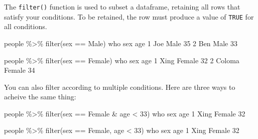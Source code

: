 \documentclass[
]{book}
\newenvironment{Shaded}{\begin{snugshade}}{\end{snugshade}}
\newcommand{\DecValTok}[1]{\textcolor[rgb]{0.00,0.00,0.81}{#1}}
\newcommand{\FunctionTok}[1]{\textcolor[rgb]{0.00,0.00,0.00}{#1}}
\newcommand{\NormalTok}[1]{#1}
\newcommand{\SpecialCharTok}[1]{\textcolor[rgb]{0.00,0.00,0.00}{#1}}
\newcommand{\StringTok}[1]{\textcolor[rgb]{0.31,0.60,0.02}{#1}}
\begin{document}
The \texttt{filter()} function is used to subset a dataframe, retaining all rows that satisfy your conditions. To be retained, the row must produce a value of \texttt{TRUE} for all conditions.

\begin{Shaded}
\begin{Highlighting}[]
\NormalTok{people }\SpecialCharTok{\%\textgreater{}\%} \FunctionTok{filter}\NormalTok{(sex }\SpecialCharTok{==} \StringTok{\textquotesingle{}Male\textquotesingle{}}\NormalTok{)}
\NormalTok{  who  sex age}
\DecValTok{1}\NormalTok{ Joe Male  }\DecValTok{35}
\DecValTok{2}\NormalTok{ Ben Male  }\DecValTok{33}
\end{Highlighting}
\end{Shaded}

\begin{Shaded}
\begin{Highlighting}[]
\NormalTok{people }\SpecialCharTok{\%\textgreater{}\%} \FunctionTok{filter}\NormalTok{(sex }\SpecialCharTok{==} \StringTok{\textquotesingle{}Female\textquotesingle{}}\NormalTok{)}
\NormalTok{     who    sex age}
\DecValTok{1}\NormalTok{   Xing Female  }\DecValTok{32}
\DecValTok{2}\NormalTok{ Coloma Female  }\DecValTok{34}
\end{Highlighting}
\end{Shaded}

You can also filter according to multiple conditions. Here are three ways to acheive the same thing:

\begin{Shaded}
\begin{Highlighting}[]
\NormalTok{people }\SpecialCharTok{\%\textgreater{}\%} \FunctionTok{filter}\NormalTok{(sex }\SpecialCharTok{==} \StringTok{\textquotesingle{}Female\textquotesingle{}} \SpecialCharTok{\&}\NormalTok{ age }\SpecialCharTok{\textless{}} \DecValTok{33}\NormalTok{)}
\NormalTok{   who    sex age}
\DecValTok{1}\NormalTok{ Xing Female  }\DecValTok{32}
\end{Highlighting}
\end{Shaded}

\begin{Shaded}
\begin{Highlighting}[]
\NormalTok{people }\SpecialCharTok{\%\textgreater{}\%} \FunctionTok{filter}\NormalTok{(sex }\SpecialCharTok{==} \StringTok{\textquotesingle{}Female\textquotesingle{}}\NormalTok{, age }\SpecialCharTok{\textless{}} \DecValTok{33}\NormalTok{)}
\NormalTok{   who    sex age}
\DecValTok{1}\NormalTok{ Xing Female  }\DecValTok{32}
\end{Highlighting}
\end{Shaded}
\end{document}
